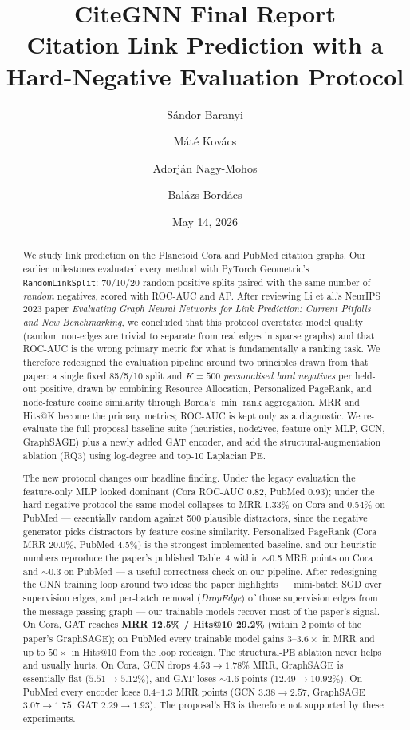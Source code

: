 \documentclass[10pt,a4paper]{article}
\title{\textbf{CiteGNN Final Report}\\\large Citation Link Prediction with a Hard-Negative Evaluation Protocol}
\author{
S\'andor Baranyi \and M\'at\'e Kov\'acs \and Adorj\'an Nagy-Mohos \and Bal\'azs Bord\'acs
}
\date{May 14, 2026}
\begin{document}
\maketitle

\begin{abstract}
We study link prediction on the Planetoid Cora and PubMed citation graphs.
Our earlier milestones evaluated every method with PyTorch Geometric's
\texttt{RandomLinkSplit}: 70/10/20 random positive splits paired with the
same number of \emph{random} negatives, scored with ROC-AUC and AP. After
reviewing Li et al.'s NeurIPS 2023 paper \emph{Evaluating Graph Neural
Networks for Link Prediction: Current Pitfalls and New Benchmarking}, we
concluded that this protocol overstates model quality (random non-edges
are trivial to separate from real edges in sparse graphs) and that
ROC-AUC is the wrong primary metric for what is fundamentally a ranking
task. We therefore redesigned the evaluation pipeline around two
principles drawn from that paper: a single fixed 85/5/10 split and
$K=500$ \emph{personalised hard negatives} per held-out positive, drawn
by combining Resource Allocation, Personalized PageRank, and node-feature
cosine similarity through Borda's $\min$ rank aggregation. MRR and
Hits@K become the primary metrics; ROC-AUC is kept only as a diagnostic.
We re-evaluate the full proposal baseline suite (heuristics, node2vec,
feature-only MLP, GCN, GraphSAGE) plus a newly added GAT encoder, and
add the structural-augmentation ablation (RQ3) using log-degree and
top-10 Laplacian PE.

The new protocol changes our headline finding. Under the legacy
evaluation the feature-only MLP looked dominant (Cora ROC-AUC 0.82,
PubMed 0.93); under the hard-negative protocol the same model collapses
to MRR 1.33\% on Cora and 0.54\% on PubMed --- essentially random
against 500 plausible distractors, since the negative generator picks
distractors by feature cosine similarity. Personalized PageRank (Cora
MRR 20.0\%, PubMed 4.5\%) is the strongest implemented baseline, and
our heuristic numbers reproduce the paper's published Table~4 within
$\sim$0.5 MRR points on Cora and $\sim$0.3 on PubMed --- a useful
correctness check on our pipeline. After redesigning the GNN training
loop around two ideas the paper highlights --- mini-batch SGD over
supervision edges, and per-batch removal (\emph{DropEdge}) of those
supervision edges from the message-passing graph --- our trainable
models recover most of the paper's signal. On Cora, GAT reaches
\textbf{MRR 12.5\% / Hits@10 29.2\%} (within 2 points of the paper's
GraphSAGE); on PubMed every trainable model gains $3$--$3.6\times$ in
MRR and up to $50\times$ in Hits@10 from the loop redesign. The
structural-PE ablation never helps and usually hurts. On Cora, GCN drops $4.53 \to 1.78\%$ MRR, GraphSAGE is essentially flat ($5.51 \to 5.12\%$), and GAT loses $\sim 1.6$ points ($12.49 \to 10.92\%$). On PubMed every encoder loses $0.4$--$1.3$ MRR points (GCN $3.38 \to 2.57$, GraphSAGE $3.07 \to 1.75$, GAT $2.29 \to 1.93$). The proposal's H3 is therefore not supported by these experiments.
\end{abstract}
\end{document}
